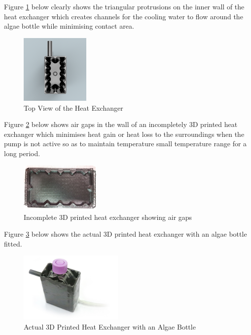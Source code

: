 \documentclass[10pt,a4paper]{IEEEtran}
\begin{document}
 	Figure \ref{fig:heat_exchanger_top} below clearly shows the triangular protrusions on the inner wall of the heat exchanger which creates channels for the cooling water to flow around the algae bottle while minimising contact area.
 	
 		\begin{figure}[H]
 			\begin{center}
 				\includegraphics[width=0.3\textwidth]{heat_exchanger_top.png}
 				\caption{Top View of the Heat Exchanger}
 				\label{fig:heat_exchanger_top}
 			\end{center}
 		\end{figure}
 	Figure \ref{fig:air_gaps} below shows air gaps in the wall of an incompletely 3D printed heat exchanger which minimises heat gain or heat loss to the surroundings when the pump is not active so as to maintain temperature small temperature range for a long period.
 		\begin{figure}[H]
 			\begin{center}
 				\includegraphics[width=0.35\textwidth]{air_gaps.jpeg}
 				\caption{Incomplete 3D printed heat exchanger showing air gaps}
 				\label{fig:air_gaps}
 			\end{center}
 		\end{figure}
 	Figure \ref{fig:actual_heatExchanger} below shows the actual 3D printed heat exchanger with an algae bottle fitted.
 		\begin{figure}[H]
 			\begin{center}
 				\includegraphics[width=0.45\textwidth]{image_heatExchanger.jpg}
 				\caption{Actual 3D Printed Heat Exchanger with an Algae Bottle}
 				\label{fig:actual_heatExchanger}
 			\end{center}
 		\end{figure}
 	
\end{document}
